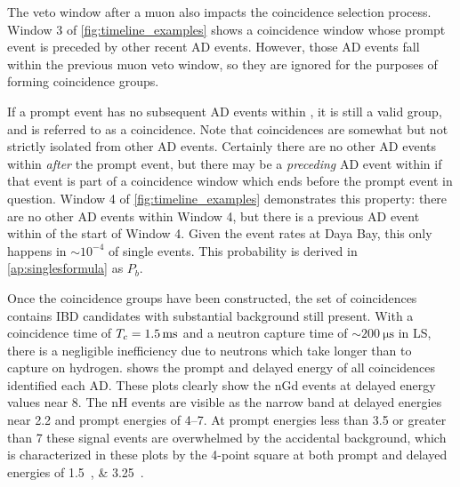 The veto window after a muon also impacts the coincidence selection process.
Window 3 of \cref{fig:timeline_examples} shows a coincidence window
whose prompt event is preceded by other recent AD events.
However, those AD events fall within the previous muon veto window,
so they are ignored for the purposes of forming coincidence groups.

If a prompt event has no subsequent AD events within \tc, it is
still a valid group, and is referred to as a  coincidence.
Note that  coincidences are somewhat but not strictly isolated
from other AD events.
Certainly there are no other AD events
within \tc{} \textit{after} the prompt event,
but there may be a \textit{preceding} AD event within \tc{}
if that event is part of a coincidence window
which ends before the prompt event in question.
Window 4 of \cref{fig:timeline_examples} demonstrates this property:
there are no other AD events within Window 4,
but there is a previous AD event within \tc{} of the start of Window 4.
Given the event rates at Daya Bay, this only happens in $\sim10^{-4}$
of single events.
This probability is derived in \cref{ap:singlesformula} as $P_b$.



Once the coincidence groups have been constructed,
the set of  coincidences
contains IBD candidates
with substantial background still present.
With a coincidence time of $\tc=\SI{1.5}{\ms}$
and a neutron capture time of $\sim\SI{200}{\us}$ in LS,
there is a negligible inefficiency due to neutrons
which take longer than \tc{} to capture on hydrogen.
 shows the prompt and delayed energy
of all  coincidences identified each AD.
These plots clearly show the nGd events
at delayed energy values near \SI{8}{\mev}.
The nH events are visible as the narrow band at
delayed energies near \SI{2.2}{\mev}
and prompt energies of \SIrange{4}{7}{\mev}.
At prompt energies less than \SI{3.5}{\mev} or greater than \SI{7}{\mev}
these signal events are overwhelmed by the accidental background,
which is characterized in these plots by the 4-point square at both prompt and
delayed energies of \SIlist{1.5;3.25}{\mev}.

